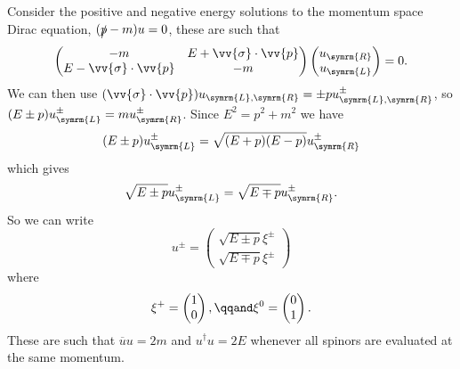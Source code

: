 \documentclass[fleqn]{NotesClass}
\newcommand{\diracadjoint}[1]{\overbar{#1}}
\newcommand{\hermit}{\dagger}
\newcommand{\Left}{\symrm{L}}
\newcommand{\Right}{\symrm{R}}
\begin{document}
    Consider the positive and negative energy solutions to the momentum space Dirac equation, \((\slashed{p} - m)u = 0\), these are such that
    \begin{equation}
        \begin{pmatrix}
            -m & E + \vv{\sigma} \cdot \vv{p}\\
            E - \vv{\sigma} \cdot \vv{p} & -m
        \end{pmatrix}
        \begin{pmatrix}
            u_{\Right}\\ u_{\Left}
        \end{pmatrix}
        = 0.
    \end{equation}
    We can then use \((\vv{\sigma} \cdot \vv{p})u_{\Left,\Right} = \pm pu_{\Left,\Right}^{\pm}\), so \((E \pm p)u_{\Left}^{\pm} = mu_{\Right}^{\pm}\).
    Since \(E^2 = p^2 + m^2\) we have
    \begin{equation}
        (E \pm p) u_{\Left}^{\pm} = \sqrt{(E + p)(E - p)}u_{\Right}^{\pm}
    \end{equation}
    which gives
    \begin{equation}
        \sqrt{E \pm p}u_{\Left}^{\pm} = \sqrt{E \mp p}u_{\Right}^{\pm}.
    \end{equation}
    So we can write
    \begin{equation}
        u^{\pm} = 
        \begin{pmatrix}
            \sqrt{E \pm p}\xi^{\pm}\\
            \sqrt{E \mp p}\xi^{\pm}
        \end{pmatrix}
    \end{equation}
    where
    \begin{equation}
        \xi^{+} = 
        \begin{pmatrix}
            1\\ 0
        \end{pmatrix}
        , \qqand \xi^{0} = 
        \begin{pmatrix}
            0\\ 1
        \end{pmatrix}
        .
    \end{equation}
    These are such that \(\diracadjoint{u}u = 2m\) and \(u^\hermit u = 2E\) whenever all spinors are evaluated at the same momentum.
    
\end{document}
